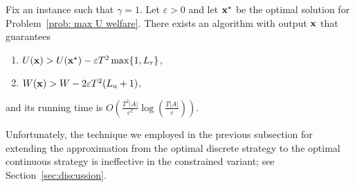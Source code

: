\begin{theorem} \label{thm: alg welfare contraint}
Fix an instance such that $\gamma = 1$. Let $\varepsilon > 0$ and let ${\bf{x}}^\star$ be the optimal solution for Problem~\eqref{prob: max U welfare}.  There exists an algorithm with output ${\bf{x}}$ that guarantees
\begin{enumerate}%
    \item $U({\bf{x}}) > U({\bf{x}}^\star) - \varepsilon T^2 \max \{1, L_r\}$, 
    \item $W({\bf{x}}) > W - 2\varepsilon T^2 (L_a+1)$,
\end{enumerate}
and its running time is $O\left(\frac{T^2 |A|}{\varepsilon^2} \log(\frac{T |A|}{\varepsilon})\right)$.
\end{theorem}
Unfortunately, the technique we employed in the previous subsection for extending the approximation from the optimal discrete strategy to the optimal continuous strategy is ineffective in the constrained variant; see Section~\ref{sec:discussion}.
